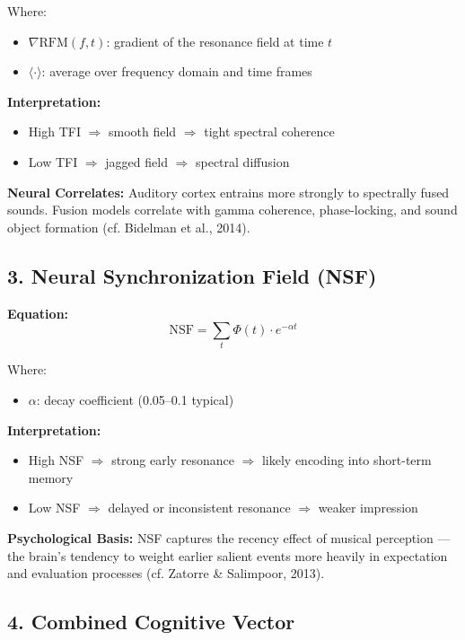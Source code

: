 Where:

\begin{itemize}
    \item $\nabla \text{RFM}(f, t)$: gradient of the resonance field at time $t$
    \item $\langle \cdot \rangle$: average over frequency domain and time frames
\end{itemize}

\textbf{Interpretation:}

\begin{itemize}
    \item High TFI $\Rightarrow$ smooth field $\Rightarrow$ tight spectral coherence
    \item Low TFI $\Rightarrow$ jagged field $\Rightarrow$ spectral diffusion
\end{itemize}

\textbf{Neural Correlates:} Auditory cortex entrains more strongly to spectrally fused sounds. Fusion models correlate with gamma coherence, phase-locking, and sound object formation (cf. Bidelman et al., 2014).

\subsection*{3. Neural Synchronization Field (NSF)}

\textbf{Equation:}
\[
\text{NSF} = \sum_t \Phi(t) \cdot e^{-\alpha t}
\]

Where:

\begin{itemize}
    \item $\alpha$: decay coefficient (0.05–0.1 typical)
\end{itemize}

\textbf{Interpretation:}

\begin{itemize}
    \item High NSF $\Rightarrow$ strong early resonance $\Rightarrow$ likely encoding into short-term memory
    \item Low NSF $\Rightarrow$ delayed or inconsistent resonance $\Rightarrow$ weaker impression
\end{itemize}

\textbf{Psychological Basis:} NSF captures the recency effect of musical perception — the brain’s tendency to weight earlier salient events more heavily in expectation and evaluation processes (cf. Zatorre \& Salimpoor, 2013).

\subsection*{4. Combined Cognitive Vector}

